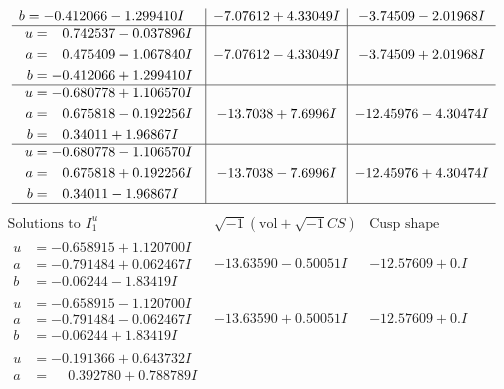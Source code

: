 \documentclass[1p]{elsarticle_modified}
\theoremstyle{definition}
\newcommand{\I}{\sqrt{-1}}
\begin{document}
$$\begin{array}{c|c|c}
\begin{aligned}
b &= -0.412066 - 1.299410 I\end{aligned}
 & -7.07612 + 4.33049 I & -3.74509 - 2.01968 I \\ \hline\begin{aligned}
u &= \phantom{-}0.742537 - 0.037896 I \\
a &= \phantom{-}0.475409 - 1.067840 I \\
b &= -0.412066 + 1.299410 I\end{aligned}
 & -7.07612 - 4.33049 I & -3.74509 + 2.01968 I \\ \hline\begin{aligned}
u &= -0.680778 + 1.106570 I \\
a &= \phantom{-}0.675818 - 0.192256 I \\
b &= \phantom{-}0.34011 + 1.96867 I\end{aligned}
 & -13.7038 + 7.6996 I & -12.45976 - 4.30474 I \\ \hline\begin{aligned}
u &= -0.680778 - 1.106570 I \\
a &= \phantom{-}0.675818 + 0.192256 I \\
b &= \phantom{-}0.34011 - 1.96867 I\end{aligned}
 & -13.7038 - 7.6996 I & -12.45976 + 4.30474 I\\
 \hline 
 \end{array}$$\newpage$$\begin{array}{c|c|c}  
\text{Solutions to }I^u_{1}& \I (\text{vol} + \sqrt{-1}CS) & \text{Cusp shape}\\
 \hline 
\begin{aligned}
u &= -0.658915 + 1.120700 I \\
a &= -0.791484 + 0.062467 I \\
b &= -0.06244 - 1.83419 I\end{aligned}
 & -13.63590 - 0.50051 I & -12.57609 + 0. I\phantom{ +0.000000I} \\ \hline\begin{aligned}
u &= -0.658915 - 1.120700 I \\
a &= -0.791484 - 0.062467 I \\
b &= -0.06244 + 1.83419 I\end{aligned}
 & -13.63590 + 0.50051 I & -12.57609 + 0. I\phantom{ +0.000000I} \\ \hline\begin{aligned}
u &= -0.191366 + 0.643732 I \\
a &= \phantom{-}0.392780 + 0.788789 I \\

\end{aligned}
\end{array}$$
\end{document}
